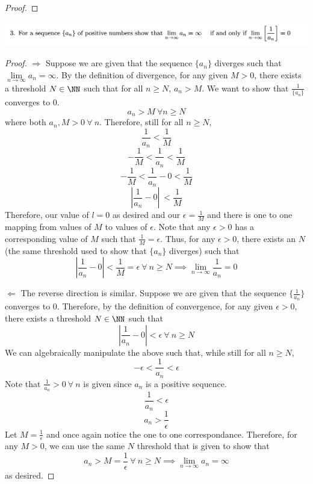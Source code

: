\documentclass[12pt]{scrartcl}
\begin{document}
\begin{enumerate}[a.]
\begin{proof}
  \end{proof}

\end{enumerate}

\newpage

\includegraphics[width=15cm]{3.png}

\begin{proof}

  \hfill
  
$\Longrightarrow$ Suppose we are given that the sequence $\{a_n\}$ diverges such that 
$\underset{n\to\infty}{\lim}a_n = \infty$. By the definition of divergence, 
for any given $M > 0$, there exists a threshold $N \in \NN$ such that for all $n \geq N$, 
$a_n > M$. We want to show that $\frac{1}{\{a_n\}}$ converges to $0$.
\[a_n > M \ \forall n \geq N\]
where both $a_n, M > 0 \ \forall \ n$. Therefore, still for all $n \geq N$, 
\[\frac{1}{a_n} < \frac{1}{M}\]
\[-\frac{1}{M} < \frac{1}{a_n} < \frac{1}{M}\]
\[-\frac{1}{M} < \frac{1}{a_n} - 0 < \frac{1}{M}\]
\[|\frac{1}{a_n} - 0|\ < \frac{1}{M}\]
Therefore, our value of $l = 0$ as desired and our $\epsilon = \frac{1}{M}$ and there is one to one mapping from values of $M$ to 
values of $\epsilon$. Note that any $\epsilon > 0$ has a corresponding value of $M$ such that $\frac{1}{M} = \epsilon$. 
Thus, for any $\epsilon > 0$, there exists an $N$ (the same threshold used to show that $\{a_n\}$ diverges)
such that
\[|\frac{1}{a_n} - 0| < \frac{1}{M} = \epsilon \ \forall \ n \geq N \implies \lim_{n\to\infty}\frac{1}{a_n} = 0\]

\hfill

$\Longleftarrow$ The reverse direction is similar. Suppose we are given that the sequence $\{\frac{1}{a_n}\}$ converges 
to $0$. Therefore, by the definition of convergence, for any given $\epsilon > 0$, there exists a threshold 
$N \in \NN$ such that
\[|\frac{1}{a_n} - 0| < \epsilon \ \forall \ n \geq N\]
We can algebraically manipulate the above such that, while still for all $n \geq N$, 
\[-\epsilon < \frac{1}{a_n} < \epsilon\]
Note that $\frac{1}{a_n} > 0 \ \forall \ n$ is given since $a_n$ is a positive sequence. 
\[\frac{1}{a_n} < \epsilon\]
\[a_n > \frac{1}{\epsilon}\]
Let $M = \frac{1}{\epsilon}$ and once again notice the one to one correspondance. Therefore, 
for any $M > 0$, we can use the same $N$ threshold that is given to show that 
\[a_n > M = \frac{1}{\epsilon} \ \forall \ n \geq N \implies \lim_{n\to\infty}a_n = \infty\]
as desired.
\end{proof}
\end{document}
